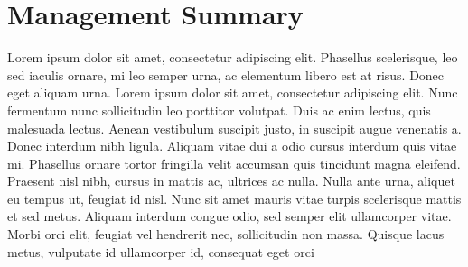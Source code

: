 \chapter*{Management Summary}
\label{chap:managementSummary}

Lorem ipsum dolor sit amet, consectetur adipiscing elit. Phasellus scelerisque, leo sed iaculis ornare, mi leo semper urna, ac elementum libero est at risus. Donec eget aliquam urna. Lorem ipsum dolor sit amet, consectetur adipiscing elit. Nunc fermentum nunc sollicitudin leo porttitor volutpat. Duis ac enim lectus, quis malesuada lectus. Aenean vestibulum suscipit justo, in suscipit augue venenatis a. Donec interdum nibh ligula. Aliquam vitae dui a odio cursus interdum quis vitae mi. Phasellus ornare tortor fringilla velit accumsan quis tincidunt magna eleifend. Praesent nisl nibh, cursus in mattis ac, ultrices ac nulla. Nulla ante urna, aliquet eu tempus ut, feugiat id nisl. Nunc sit amet mauris vitae turpis scelerisque mattis et sed metus. Aliquam interdum congue odio, sed semper elit ullamcorper vitae. Morbi orci elit, feugiat vel hendrerit nec, sollicitudin non massa. Quisque lacus metus, vulputate id ullamcorper id, consequat eget orci 
